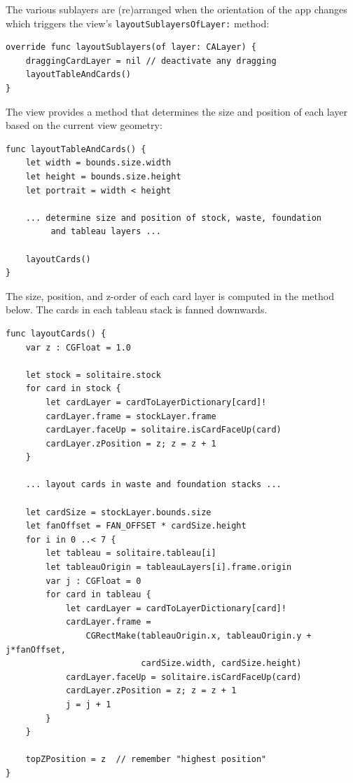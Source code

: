\documentclass[11pt]{article}
\begin{document}
The various sublayers are (re)arranged when the orientation
of the app changes which triggers the 
view's {\tt layoutSublayersOfLayer:} method:
\begin{verbatim}
override func layoutSublayers(of layer: CALayer) {
    draggingCardLayer = nil // deactivate any dragging
    layoutTableAndCards()
}
\end{verbatim}
The view provides a method that determines the size and position
of each layer based on the current view geometry:
\begin{verbatim}
func layoutTableAndCards() {
    let width = bounds.size.width
    let height = bounds.size.height
    let portrait = width < height
    
    ... determine size and position of stock, waste, foundation
         and tableau layers ...
    
    layoutCards()
}
\end{verbatim}
The size, position, and z-order of each card layer is computed
in the method below. The cards in each tableau stack is fanned downwards.
\begin{verbatim}
func layoutCards() {
    var z : CGFloat = 1.0
      
    let stock = solitaire.stock
    for card in stock {
        let cardLayer = cardToLayerDictionary[card]!
        cardLayer.frame = stockLayer.frame
        cardLayer.faceUp = solitaire.isCardFaceUp(card)
        cardLayer.zPosition = z; z = z + 1
    }
 
    ... layout cards in waste and foundation stacks ...
    
    let cardSize = stockLayer.bounds.size
    let fanOffset = FAN_OFFSET * cardSize.height
    for i in 0 ..< 7 {
        let tableau = solitaire.tableau[i]
        let tableauOrigin = tableauLayers[i].frame.origin
        var j : CGFloat = 0
        for card in tableau {
            let cardLayer = cardToLayerDictionary[card]!
            cardLayer.frame = 
                CGRectMake(tableauOrigin.x, tableauOrigin.y + j*fanOffset, 
                           cardSize.width, cardSize.height)
            cardLayer.faceUp = solitaire.isCardFaceUp(card)
            cardLayer.zPosition = z; z = z + 1
            j = j + 1
        }
    }
    
    topZPosition = z  // remember "highest position"
}
\end{verbatim}
\end{document}
